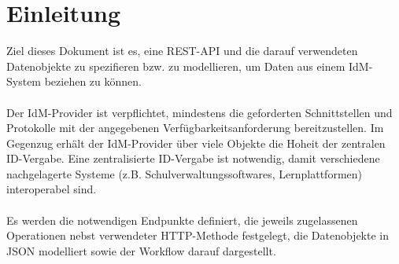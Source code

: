 \chapter{Einleitung}
Ziel dieses Dokument ist es, eine REST-API und die darauf verwendeten Datenobjekte zu spezifieren bzw. zu modellieren, um Daten aus einem IdM-System beziehen zu können.\\
\\
Der IdM-Provider ist verpflichtet, mindestens die geforderten Schnittstellen und Protokolle mit der angegebenen Verfügbarkeitsanforderung bereitzustellen. 
Im Gegenzug erhält der IdM-Provider über viele Objekte die Hoheit der zentralen ID-Vergabe. 
Eine zentralisierte ID-Vergabe ist notwendig, damit verschiedene nachgelagerte Systeme (z.B. Schulverwaltungssoftwares, Lernplattformen) interoperabel sind.\\
\\
Es werden die notwendigen Endpunkte definiert, die jeweils zugelassenen Operationen nebst verwendeter HTTP-Methode festgelegt, die Datenobjekte in JSON modelliert sowie der Workflow darauf dargestellt.



